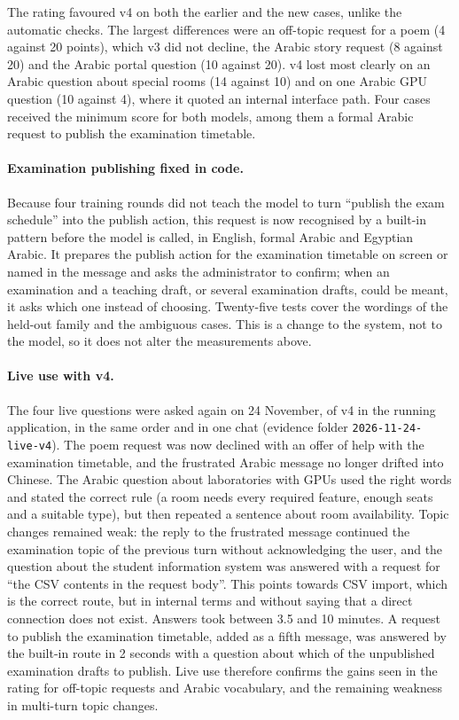 The rating favoured v4 on both the earlier and the new cases, unlike the automatic checks. The largest differences were an off-topic request for a poem (4 against 20 points), which v3 did not decline, the Arabic story request (8 against 20) and the Arabic portal question (10 against 20). v4 lost most clearly on an Arabic question about special rooms (14 against 10) and on one Arabic GPU question (10 against 4), where it quoted an internal interface path. Four cases received the minimum score for both models, among them a formal Arabic request to publish the examination timetable.

\paragraph{Examination publishing fixed in code.} Because four training rounds did not teach the model to turn ``publish the exam schedule'' into the publish action, this request is now recognised by a built-in pattern before the model is called, in English, formal Arabic and Egyptian Arabic. It prepares the publish action for the examination timetable on screen or named in the message and asks the administrator to confirm; when an examination and a teaching draft, or several examination drafts, could be meant, it asks which one instead of choosing. Twenty-five tests cover the wordings of the held-out family and the ambiguous cases. This is a change to the system, not to the model, so it does not alter the measurements above.


\paragraph{Live use with v4.} The four live questions were asked again on 24 November, of v4 in the running application, in the same order and in one chat (evidence folder \texttt{2026-11-24-live-v4}). The poem request was now declined with an offer of help with the examination timetable, and the frustrated Arabic message no longer drifted into Chinese. The Arabic question about laboratories with GPUs used the right words and stated the correct rule (a room needs every required feature, enough seats and a suitable type), but then repeated a sentence about room availability. Topic changes remained weak: the reply to the frustrated message continued the examination topic of the previous turn without acknowledging the user, and the question about the student information system was answered with a request for ``the CSV contents in the request body''. This points towards CSV import, which is the correct route, but in internal terms and without saying that a direct connection does not exist. Answers took between 3.5 and 10 minutes. A request to publish the examination timetable, added as a fifth message, was answered by the built-in route in 2 seconds with a question about which of the unpublished examination drafts to publish. Live use therefore confirms the gains seen in the rating for off-topic requests and Arabic vocabulary, and the remaining weakness in multi-turn topic changes.

